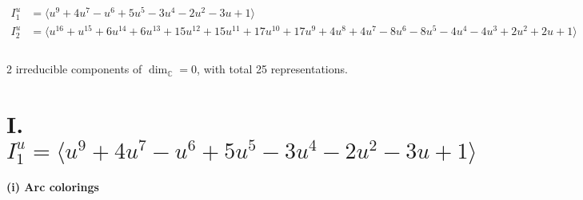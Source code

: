 \documentclass[1p]{elsarticle_modified}
\theoremstyle{definition}
\begin{document}
\begin{align*}
I^u_{1}&=\langle 
u^9+4 u^7- u^6+5 u^5-3 u^4-2 u^2-3 u+1\rangle \\
I^u_{2}&=\langle 
u^{16}+u^{15}+6 u^{14}+6 u^{13}+15 u^{12}+15 u^{11}+17 u^{10}+17 u^9+4 u^8+4 u^7-8 u^6-8 u^5-4 u^4-4 u^3+2 u^2+2 u+1\rangle \\
\\
\end{align*}
\raggedright * 2 irreducible components of $\dim_{\mathbb{C}}=0$, with total 25 representations.\\
\newpage
\renewcommand{\arraystretch}{1}
\centering \section*{I. $I^u_{1}= \langle u^9+4 u^7- u^6+5 u^5-3 u^4-2 u^2-3 u+1 \rangle$}
\flushleft \textbf{(i) Arc colorings}\\
\end{document}

